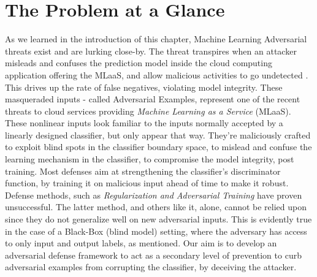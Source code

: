 \documentclass[grad,lot,lof,11pt,oneside,onehalfspace]{RUthesis}
\begin{document}
\section{The Problem at a Glance}
  As we learned in the introduction of this chapter, Machine Learning Adversarial threats exist and are lurking close-by. The threat transpires when an attacker misleads and confuses the prediction model inside the cloud computing application offering the MLaaS, and allow malicious activities to go undetected \cite{papernot_practical_2016}. This  drives up the rate of false negatives, violating model integrity. These masqueraded inputs - called Adversarial Examples\cite{kurakin_adversarial_2016}, represent one of the recent threats to cloud services providing\textit{ Machine Learning as a Service} (MLaaS). These nonlinear inputs look familiar to the inputs normally accepted by a linearly designed classifier, but only appear that way. They’re maliciously crafted to exploit blind spots in the classifier boundary space, to mislead and confuse the learning mechanism in the classifier, to compromise the model integrity, post training. Most defenses aim at strengthening the classifier’s discriminator function, by training it on malicious input ahead of time to make it robust. Defense methods,  such as \textit{Regularization and Adversarial Training} have proven unsuccessful. The latter method, and others like it, alone, cannot be relied upon since they do not generalize well on new adversarial inputs.  This is evidently true in the case of a Black-Box (blind model) setting, where the adversary has access to only input and output labels, as mentioned. Our aim is to develop an adversarial defense framework to act as a secondary level of prevention to curb adversarial examples from corrupting the classifier, by deceiving the attacker.
\end{document}
